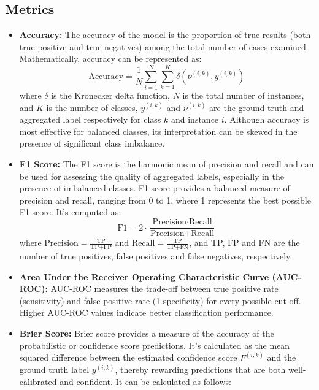 \subsection{Metrics}
\begin{itemize}
    \item \textbf{Accuracy:} The accuracy of the model is the proportion of true results (both true positive and true negatives) among the total number of cases examined. Mathematically, accuracy can be represented as:
    \begin{equation}
    \text{Accuracy}= \frac{1}{N} \sum_{i=1}^{N} \sum_{k=1}^{K} \delta\left(\nu^{(i,k)}, y^{(i,k)}\right)
    \end{equation}
    where $\delta$ is the Kronecker delta function, $N$ is the total number of instances, and $K$ is the number of classes, $y^{(i,k)}$ and $\nu^{(i,k)}$ are the ground truth and aggregated label respectively for class $k$ and instance $i$. Although accuracy is most effective for balanced classes, its interpretation can be skewed in the presence of significant class imbalance.
    \item \textbf{F1 Score:} The F1 score is the harmonic mean of precision and recall and can be used for assessing the quality of aggregated labels, especially in the presence of imbalanced classes. F1 score provides a balanced measure of precision and recall, ranging from 0 to 1, where 1 represents the best possible F1 score. It's computed as:
    \begin{equation}
    \text{F1} = 2 \cdot \frac{\text{Precision} \cdot \text{Recall}}{\text{Precision} + \text{Recall}}
    \end{equation}
    where $\text{Precision} = \frac{\text{TP}}{\text{TP+FP}}$ and $\text{Recall} = \frac{\text{TP}}{\text{TP+FN}}$, and TP, FP and FN are the number of true positives, false positives and false negatives, respectively.
    \item \textbf{Area Under the Receiver Operating Characteristic Curve (AUC-ROC):} AUC-ROC measures the trade-off between true positive rate (sensitivity) and false positive rate (1-specificity) for every possible cut-off. Higher AUC-ROC values indicate better classification performance.
    \item \textbf{Brier Score:} Brier score provides a measure of the accuracy of the probabilistic or confidence score predictions. It's calculated as the mean squared difference between the estimated confidence score $F^{(i,k)}$ and the ground truth label $y^{(i,k)}$, thereby rewarding predictions that are both well-calibrated and confident. It can be calculated as follows:

\end{itemize}
